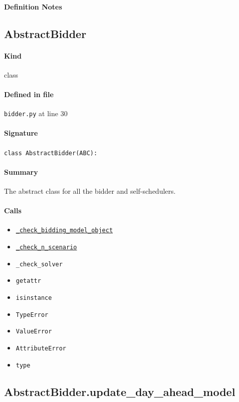 \documentclass[11pt]{report}
\begin{document}
\paragraph{Definition Notes}
\subsection{AbstractBidder}
\label{def:bidder.py:AbstractBidder:L30}
\paragraph{Kind} class
\paragraph{Defined in file} \texttt{bidder.py} at line 30
\paragraph{Signature} \texttt{class AbstractBidder(ABC):}
\paragraph{Summary} The abstract class for all the bidder and self-schedulers.
\paragraph{Calls}
\begin{itemize}[leftmargin=*]
  \item \hyperref[def:bidder.py:AbstractBidder._check_bidding_model_object:L167]{\texttt{\_check\_bidding\_model\_object}}
  \item \hyperref[def:bidder.py:AbstractBidder._check_n_scenario:L192]{\texttt{\_check\_n\_scenario}}
  \item \texttt{\_check\_solver}
  \item \texttt{getattr}
  \item \texttt{isinstance}
  \item \texttt{TypeError}
  \item \texttt{ValueError}
  \item \texttt{AttributeError}
  \item \texttt{type}
\end{itemize}
\subsection{AbstractBidder.update\_day\_ahead\_model}
\label{def:bidder.py:AbstractBidder.update_day_ahead_model:L36}
\end{document}
